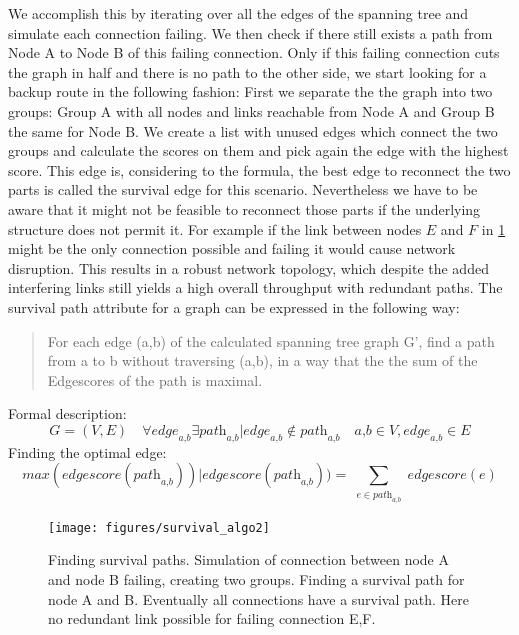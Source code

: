       We accomplish this by iterating over all the edges of the spanning tree and simulate each connection failing. We then check if there still exists 
      a path from Node A to Node B of this failing connection. Only if this failing connection cuts the graph in half and there is no path to the other side,
      we start looking for a backup route in the following fashion:
      First we separate the the graph into two groups: Group A with all nodes and links reachable from Node A and Group B the same for Node B.
      We create a list with unused edges which connect the two groups and calculate the scores on them and pick again the edge with the highest score.
      This edge is, considering to the formula, the best edge to reconnect the two parts is called the survival edge for this scenario.
      Nevertheless we have to be aware that it might not be feasible to reconnect those parts if the underlying structure does not permit it.
      For example if the link between nodes \(E\) and \(F\) in \ref{fig:survival_algo} might be the only connection possible and failing it would cause network disruption.
      This results in a robust network topology, which despite the added interfering links still yields a high overall throughput with redundant paths.
      The survival path attribute for a graph can be expressed in the following way:
      \begin{quote}
	For each edge (a,b) of the calculated spanning tree graph G', find a path from a to b without traversing (a,b), 
	in a way that the the sum of the Edgescores of the path is maximal.
      \end{quote}
      Formal description:
      $$\textit{G}=(\textit{V},\textit{E}) \quad
	\forall \textit{edge}_\textit{a,b} \exists \textit{path}_\textit{a,b} | \textit{edge}_\textit{a,b} \notin \textit{path}_\textit{a,b} \quad
	\textit{a,b} \in \textit{V}, \textit{edge}_\textit{a,b} \in \textit{E}$$
	Finding the optimal edge:
	$$\textit{max}(\textit{edgescore}(\textit{path}_\textit{a,b})) |
	\textit{edgescore}(\textit{path}_\textit{a,b})) = \sum_{\substack{e \in \textit{path}_\textit{a,b}}} \textit{edgescore}(e)$$
      \begin{figure}[h!]
	\centering
	\texttt{[image: figures/survival\_algo2]}
	\caption{Finding survival paths. Simulation of connection between node A and node B failing, creating two groups.
	  Finding a survival path for node A and B. Eventually all connections have a survival path. Here no redundant link possible for failing connection E,F.}
	\label{fig:survival_algo}
      \end{figure}
      
